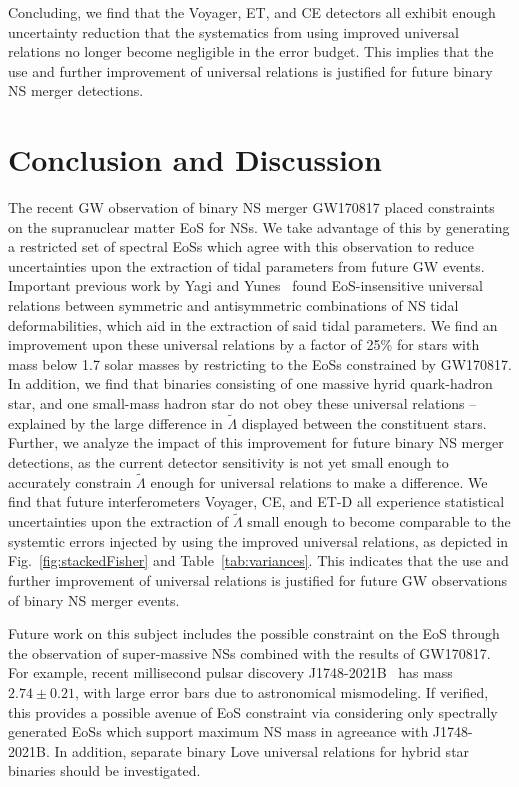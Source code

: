 \documentclass[prd,twocolumn,nofootinbib,superscriptaddress,amsmath,amssymb]{revtex4-1}
\begin{document}
Concluding, we find that the Voyager, ET, and CE detectors all exhibit enough uncertainty reduction that the systematics from using improved universal relations no longer become negligible in the error budget.
This implies that the use and further improvement of universal relations is justified for future binary NS merger detections.

\section{Conclusion and Discussion}\label{sec:conclusion}
The recent GW observation of binary NS merger GW170817 placed constraints on the supranuclear matter EoS for NSs.
We take advantage of this by generating a restricted set of spectral EoSs which agree with this observation to reduce uncertainties upon the extraction of tidal parameters from future GW events.
Important previous work by Yagi and Yunes~\cite{Yagi:ILQ,Yagi:binLove} found EoS-insensitive universal relations between symmetric and antisymmetric combinations of NS tidal deformabilities, which aid in the extraction of said tidal parameters.
We find an improvement upon these universal relations by a factor of 25\% for stars with mass below 1.7 solar masses by restricting to the EoSs constrained by GW170817.
In addition, we find that binaries consisting of one massive hyrid quark-hadron star, and one small-mass hadron star do not obey these universal relations -- explained by the large difference in $\tilde{\Lambda}$ displayed between the constituent stars.
Further, we analyze the impact of this improvement for future binary NS merger detections, as the current detector sensitivity is not yet small enough to accurately constrain $\tilde{\Lambda}$ enough for universal relations to make a difference.
We find that future interferometers Voyager, CE, and ET-D all experience statistical uncertainties upon the extraction of $\tilde{\Lambda}$ small enough to become comparable to the systemtic errors injected by using the improved universal relations, as depicted in Fig.~\ref{fig:stackedFisher} and Table~\ref{tab:variances}.
This indicates that the use and further improvement of universal relations is justified for future GW observations of binary NS merger events.

Future work on this subject includes the possible constraint on the EoS through the observation of super-massive NSs combined with the results of GW170817.
For example, recent millisecond pulsar discovery J1748-2021B~\cite{Freire:superMassiveNS} has mass $2.74 \pm 0.21$, with large error bars due to astronomical mismodeling.
If verified, this provides a possible avenue of EoS constraint via considering only spectrally generated EoSs which support maximum NS mass in agreeance with J1748-2021B.
In addition, separate binary Love universal relations for hybrid star binaries should be investigated.
\end{document}
